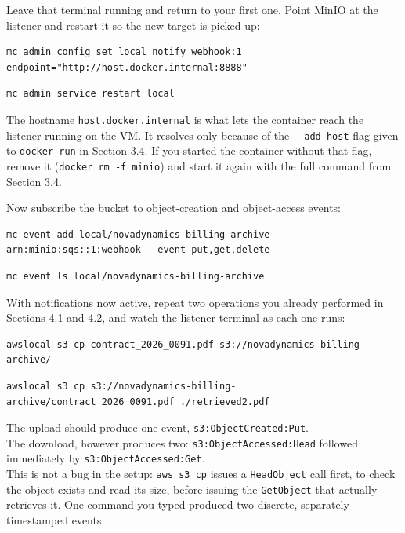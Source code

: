 \noindent
Leave that terminal running and return to your first one. Point MinIO at the listener and restart
it so the new target is picked up:

\begin{lstlisting}
mc admin config set local notify_webhook:1 endpoint="http://host.docker.internal:8888"
\end{lstlisting}
\begin{lstlisting}
mc admin service restart local
\end{lstlisting}

\begin{warningbox}
The hostname \texttt{host.docker.internal} is what lets the container reach the listener running
on the VM. It resolves only because of the \texttt{-\/-add-host} flag given to \texttt{docker run}
in Section 3.4. If you started the container without that flag, remove it
(\texttt{docker rm -f minio}) and start it again with the full command from Section 3.4.
\end{warningbox}

\noindent
Now subscribe the bucket to object-creation and object-access events:

\begin{lstlisting}
mc event add local/novadynamics-billing-archive arn:minio:sqs::1:webhook --event put,get,delete
\end{lstlisting}
\begin{lstlisting}
mc event ls local/novadynamics-billing-archive
\end{lstlisting}

\noindent
With notifications now active, repeat two operations you already performed in Sections 4.1 and
4.2, and watch the listener terminal as each one runs:

\begin{lstlisting}
awslocal s3 cp contract_2026_0091.pdf s3://novadynamics-billing-archive/
\end{lstlisting}
\begin{lstlisting}
awslocal s3 cp s3://novadynamics-billing-archive/contract_2026_0091.pdf ./retrieved2.pdf
\end{lstlisting}

\noindent
The upload should produce one event, \texttt{s3:ObjectCreated:Put}. \\
The download, however,produces two: \texttt{s3:ObjectAccessed:Head} followed immediately by \texttt{s3:ObjectAccessed:Get}. \\
This is not a bug in the setup: \texttt{aws s3 cp} issues a \texttt{HeadObject} call first, to check the object exists and read its size, before issuing the \texttt{GetObject} that actually retrieves it. One command you typed produced two discrete, separately timestamped events.
\medskip

